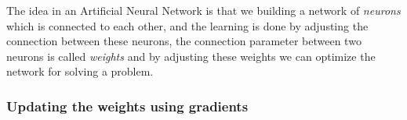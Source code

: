\documentclass[11pt]{article}
\begin{document}
The idea in an Artificial Neural Network is that we building a network of \textit{neurons} which is connected to each other,
and the learning is done by adjusting the connection between these neurons,
the connection parameter between two neurons is called \textit{weights} and by adjusting these weights
we can optimize the network for solving a problem.

\subsubsection{Updating the weights using gradients}
\end{document}
